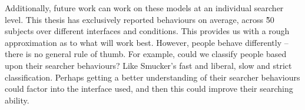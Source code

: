 Additionally, future work can work on these models at an individual searcher level. This thesis has exclusively reported behaviours on average, across \~ 50 subjects over different interfaces and conditions. This provides us with a rough approximation as to what will work best. However, people behave differently -- there is no general rule of thumb. For example, could we classify people based upon their searcher behaviours? Like Smucker's fast and liberal, slow and strict classification. Perhaps getting a better understanding of their searcher behaviours could factor into the interface used, and then this could improve their searching ability.
















%
%
%
%
%
%
%
%
%
%

